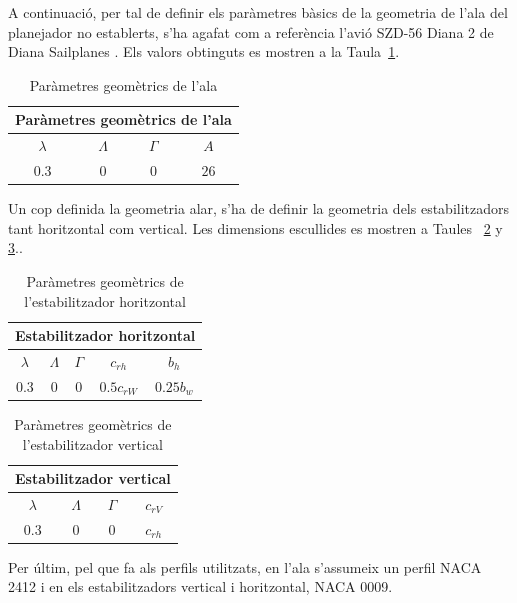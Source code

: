 A continuació, per tal de definir els paràmetres bàsics de la geometria de l'ala del planejador no establerts, s'ha agafat com a referència l'avió SZD-56 Diana 2 de Diana Sailplanes \cite{Kubrynski2006}. Els valors obtinguts es mostren a la Taula~\ref{tab:WingGeom}.

\begin{table} [h]
	\centering
	\caption{Paràmetres geomètrics de l'ala} \label{tab:WingGeom}
	\vspace{10pt}
	\begin{tabular}{| c | c | c | c |}	
		\hline
		\multicolumn{4}{|c|}{\bfseries Paràmetres geomètrics de l'ala} \\
		\hline\hline
	\textbf{$\lambda$} & \textbf{$\Lambda$} & \textbf{$\Gamma$} & \textbf{$A$}\\ \hline 
		$0.3$ & $0$ & $0$ & $26$\\
		\hline	
	\end{tabular} 
\end{table}

Un cop definida la geometria alar, s'ha de definir la geometria dels estabilitzadors tant horitzontal com vertical. Les dimensions escullides es mostren a Taules~ \ref{tab:HSGeom} y \ref{tab:VSGeom}..

\begin{table} [h]
	\centering
	\caption{Paràmetres geomètrics de l'estabilitzador horitzontal} \label{tab:HSGeom}
	\vspace{10pt}
	\begin{tabular}{| c | c | c | c | c |}	
		\hline
		\multicolumn{5}{|c|}{\bfseries Estabilitzador horitzontal} \\
		\hline\hline
	\textbf{$\lambda$} & \textbf{$\Lambda$} & \textbf{$\Gamma$} & \textbf{$c_{rh}$} & \textbf{$b_{h}$} \\ \hline
		$0.3$ & $0$ & $0$ & $0.5c_{rW}$ & $0.25b_{w}$\\
		\hline	
	\end{tabular} 
\end{table}

\begin{table} [h]
	\centering
	\caption{Paràmetres geomètrics de l'estabilitzador vertical} \label{tab:VSGeom}
	\vspace{10pt}
	\begin{tabular}{| c | c | c | c |}	
		\hline
		\multicolumn{4}{|c|}{\bfseries Estabilitzador vertical} \\
		\hline\hline
	\textbf{$\lambda$} & \textbf{$\Lambda$} & \textbf{$\Gamma$} & \textbf{$c_{rV}$}  \\ \hline
		$0.3$ & $0$ & $0$ & $c_{rh}$ \\
		\hline	
	\end{tabular} 
\end{table}

Per últim, pel que fa als perfils utilitzats, en l'ala s'assumeix un perfil NACA 2412 i en els estabilitzadors vertical i horitzontal, NACA 0009.